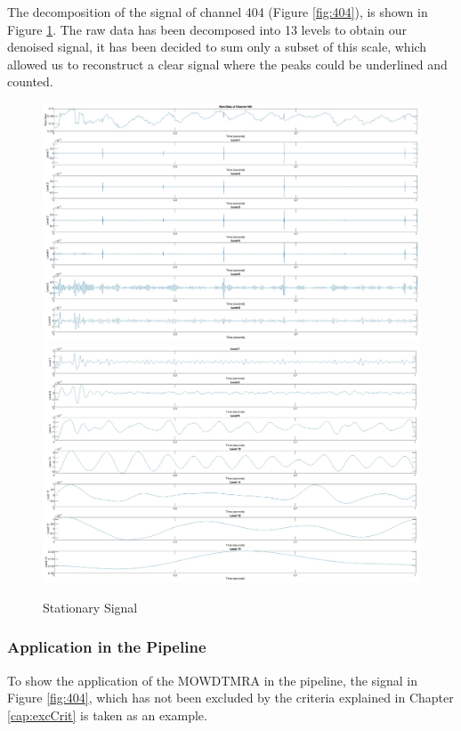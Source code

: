 The decomposition of the signal of channel 404 (Figure \ref{fig:404}), is shown in Figure \ref{fig:level1}. The raw data has been decomposed into 13 levels to obtain our denoised signal, it has been decided to sum only a subset of this scale, which allowed us to reconstruct a clear signal where the peaks could be underlined and counted. 

\begin{figure}[p]
    \centering
    \includegraphics[width=\textwidth]{img/lev1.png}
    \includegraphics[width=\textwidth]{img/lev2.png}
    \caption{Stationary Signal}
    \label{fig:level1}
\end{figure}

\subsubsection{Application in the Pipeline}
To show the application of the MOWDTMRA in the pipeline, the signal in Figure \ref{fig:404}, which has not been excluded by the criteria explained in Chapter \ref{cap:excCrit} is taken as an example.

